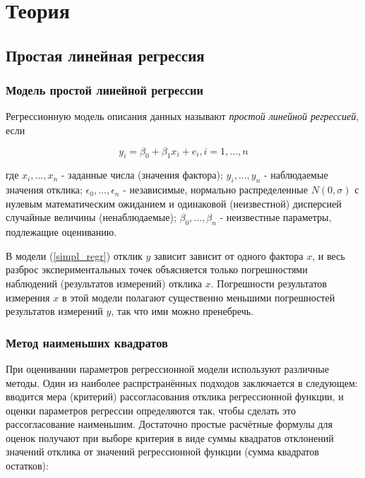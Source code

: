 \documentclass[a4paper]{article}
\begin{document}
\section{Теория}

    \subsection{Простая линейная регрессия}
    
        \subsubsection{Модель простой линейной регрессии}
    
        Регрессионную модель описания данных называют \textit{простой линейной регрессией}, если 
        
        \begin{equation} \label{simpl_regr}
            y_i = \beta_0 + \beta_1x_i + e_i, i = 1, ..., n
        \end{equation}
        
        где $x_i, ..., x_n$ - заданные числа (значения фактора); $y_i, ..., y_n$ - наблюдаемые значения отклика; $\epsilon_0, ..., \epsilon_n$ - независимые, нормально распределенные $N(0, \sigma)$ с нулевым математическим ожиданием и одинаковой (неизвестной) дисперсией случайные величины (ненаблюдаемые); $\beta_0, ..., \beta_n$ - неизвестные параметры, подлежащие оцениванию.
        
        В модели (\ref{simpl_regr}) отклик $y$ зависит зависит от одного фактора $x$, и весь разброс экспериментальных точек объясняется только погрешностями наблюдений (результатов измерений) отклика $x$. Погрешности результатов измерения $x$ в этой модели полагают существенно меньшими погрешностей результатов измерений $y$, так что ими можно пренебречь.

        \subsubsection{Метод наименьших квадратов}
        
       При оценивании параметров регрессионной модели используют различные методы. Один из наиболее распрстранённых подходов заключается в следующем: вводится мера (критерий) рассогласования отклика  регрессионной функции, и оценки параметров регрессии определяются так, чтобы сделать это рассогласование наименьшим. Достаточно простые расчётные формулы для оценок получают при выборе критерия в виде суммы квадратов отклонений значений отклика от значений регрессионной функции (сумма квадратов остатков):
        
\end{document}
